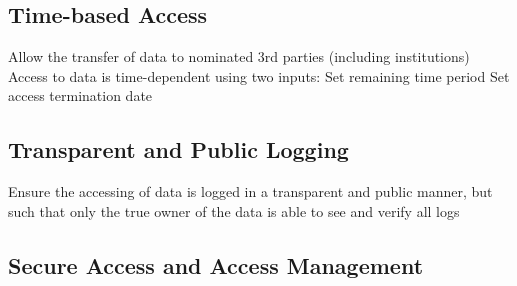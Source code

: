 \subsection{Time-based Access}

\begin{outline}
  \1 Allow the transfer of data to nominated 3rd parties (including institutions)
  \1 Access to data is time-dependent using two inputs:
    \2 Set remaining time period
    \2 Set access termination date
\end{outline}

\subsection{Transparent and Public Logging}

\begin{outline}
  \1 Ensure the accessing of data is logged in a transparent and public manner, but such that only the true owner of the data is able to see and verify all logs
\end{outline}

\subsection{Secure Access and Access Management}

